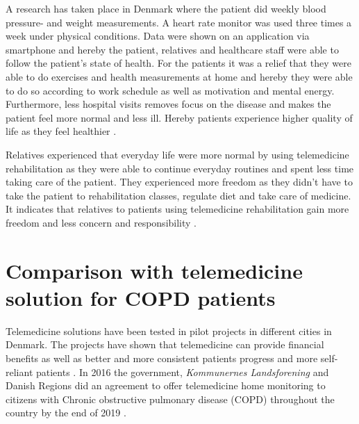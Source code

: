 A research has taken place in Denmark where the patient did weekly blood pressure- and weight measurements. A heart rate monitor was used three times a week under physical conditions. Data were shown on an application via smartphone and hereby the patient, relatives and healthcare staff were able to follow the patient’s state of health. For the patients it was a relief that they were able to do exercises and health measurements at home and hereby they were able to do so according to work schedule as well as motivation and mental energy. Furthermore, less hospital visits removes focus on the disease and makes the patient feel more normal and less ill. Hereby patients experience higher quality of life as they feel healthier \cite{Bregendahl_2016}.  

Relatives experienced that everyday life were more normal by using telemedicine rehabilitation as they were able to continue everyday routines and spent less time taking care of the patient. They experienced more freedom as they didn’t have to take the patient to rehabilitation classes, regulate diet and take care of medicine. It indicates that relatives to patients using telemedicine rehabilitation gain more freedom and less concern and responsibility \cite{7}.  

   
\section{Comparison with telemedicine solution for COPD patients}

Telemedicine solutions have been tested in pilot projects in different cities in Denmark. The projects have shown that telemedicine can provide financial benefits as well as better and more consistent patients progress and more self-reliant patients \cite{KOL_1}. In 2016 the government, \textit{Kommunernes Landsforening} and Danish Regions did an agreement to offer telemedicine home monitoring to citizens with Chronic obstructive pulmonary disease (COPD) throughout the country by the end of 2019 \cite{KOL_2}. 

